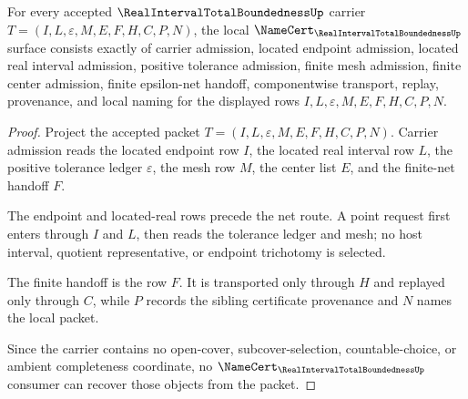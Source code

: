 \begin{theorem}
\label{thm:real-interval-total-boundedness-namecert-obligations}
For every accepted $\RealIntervalTotalBoundednessUp$ carrier $T=(I,L,\varepsilon,M,E,F,H,C,P,N)$, the local $\NameCert_{\RealIntervalTotalBoundednessUp}$ surface consists exactly of carrier admission, located endpoint admission, located real interval admission, positive tolerance admission, finite mesh admission, finite center admission, finite epsilon-net handoff, componentwise transport, replay, provenance, and local naming for the displayed rows $I,L,\varepsilon,M,E,F,H,C,P,N$.
\end{theorem}
\begin{proof}
Project the accepted packet $T=(I,L,\varepsilon,M,E,F,H,C,P,N)$. Carrier admission reads the located endpoint row $I$, the located real interval row $L$, the positive tolerance ledger $\varepsilon$, the mesh row $M$, the center list $E$, and the finite-net handoff $F$.

The endpoint and located-real rows precede the net route. A point request first enters through $I$ and $L$, then reads the tolerance ledger and mesh; no host interval, quotient representative, or endpoint trichotomy is selected.

The finite handoff is the row $F$. It is transported only through $H$ and replayed only through $C$, while $P$ records the sibling certificate provenance and $N$ names the local packet.

Since the carrier contains no open-cover, subcover-selection, countable-choice, or ambient completeness coordinate, no $\NameCert_{\RealIntervalTotalBoundednessUp}$ consumer can recover those objects from the packet.
\end{proof}

